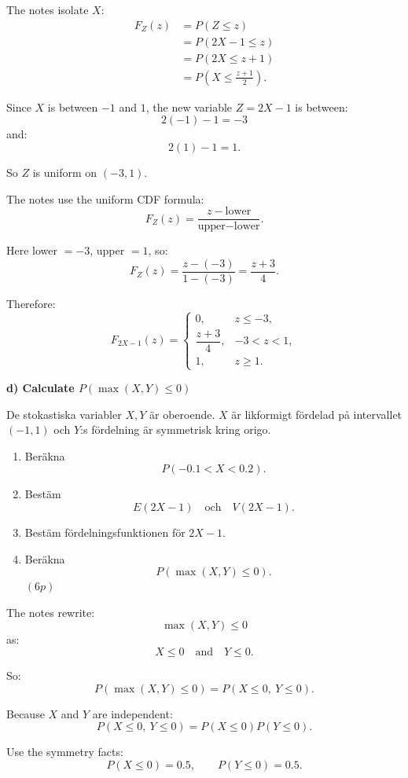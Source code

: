 \documentclass[10pt]{article}
\begin{document}
The notes isolate \(X\):
\begin{align*}
F_Z(z)
&=
P(Z\le z)
\\[2mm]
&=
P(2X-1\le z)
\\[2mm]
&=
P(2X\le z+1)
\\[2mm]
&=
P\left(X\le \frac{z+1}{2}\right).
\end{align*}

Since \(X\) is between \(-1\) and \(1\), the new
variable \(Z=2X-1\) is between:
\[
2(-1)-1=-3
\]
and:
\[
2(1)-1=1.
\]

So \(Z\) is uniform on \((-3,1)\).

The notes use the uniform CDF formula:
\[
F_Z(z)
=
\frac{z-\text{lower}}{\text{upper}-\text{lower}}.
\]

Here lower \(=-3\), upper \(=1\), so:
\[
F_Z(z)
=
\frac{z-(-3)}{1-(-3)}
=
\frac{z+3}{4}.
\]

Therefore:
\[
F_{2X-1}(z)=
\begin{cases}
0,
& z\le -3,\\
\dfrac{z+3}{4},
& -3<z<1,\\
1,
& z\ge 1.
\end{cases}
\]

\textbf{d) Calculate \(P(\max(X,Y)\le 0)\)}

De stokastiska variabler \(X,Y\) är oberoende.
\(X\) är likformigt fördelad på intervallet
\((-1,1)\) och \(Y\):s fördelning är symmetrisk
kring origo.

\begin{enumerate}[label=\alph*)]
\item Beräkna
\[
P(-0.1<X<0.2).
\]

\item Bestäm
\[
E(2X-1)
\quad\text{och}\quad
V(2X-1).
\]

\item Bestäm fördelningsfunktionen för \(2X-1\).

\item Beräkna
\[
P(\max(X,Y)\le 0).
\]
\((6p)\)
\end{enumerate}

The notes rewrite:
\[
\max(X,Y)\le 0
\]
as:
\[
X\le 0
\quad\text{and}\quad
Y\le 0.
\]

So:
\[
P(\max(X,Y)\le 0)
=
P(X\le 0,\ Y\le 0).
\]

Because \(X\) and \(Y\) are independent:
\[
P(X\le 0,\ Y\le 0)
=
P(X\le 0)P(Y\le 0).
\]

Use the symmetry facts:
\[
P(X\le 0)=0.5,
\qquad
P(Y\le 0)=0.5.
\]
\end{document}
